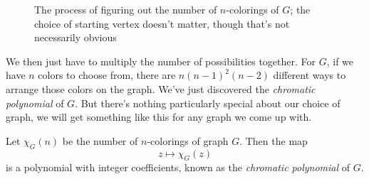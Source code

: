 \documentclass[12pt,oneside]{../../sfsuthesis}
\begin{document}
\begin{figure}[H]
\begin{subfigure}[t]{0.24\textwidth}

    \end{subfigure}
    \hfill
    \begin{subfigure}[t]{0.24\textwidth}
        \centering

    \end{subfigure}
    \caption{The process of figuring out the number of \( n \)-colorings of \( G \); the choice of starting vertex doesn't matter, though that's not necessarily obvious}
\end{figure}

We then just have to multiply the number of possibilities together.
For \( G \), if we have \( n \) colors to choose from, there are \( n {(n-1)}^2 (n - 2) \) different ways to arrange those colors on the graph.
We've just discovered the \emph{chromatic polynomial} of \( G \).
But there's nothing particularly special about our choice of graph, we will get something like this for any graph we come up with.

\begin{proposition}\th\label{def:chromaticPoly}

    Let \( \chi_G(n) \) be the number of \( n \)-colorings of graph \( G \).
    Then the map
    \[
        z \mapsto \chi_G(z)
    \]
    is a polynomial with integer coefficients, known as the \emph{chromatic polynomial} of \( G \).

\end{proposition}
\end{document}
